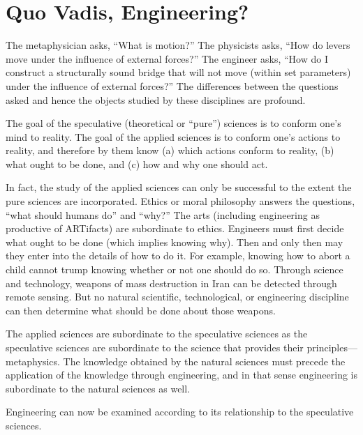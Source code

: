 \section{Quo Vadis, Engineering?}

The metaphysician asks, ``What is motion?'' The physicists asks, ``How do levers move under the influence of external forces?'' The engineer asks, ``How do I construct a structurally sound bridge that will not move (within set parameters) under the influence of external forces?'' The differences between the questions asked and hence the objects studied by these disciplines are profound.

The goal of the speculative (theoretical or ``pure'') sciences is to conform one's mind to reality. The goal of the applied sciences is to conform one's actions to reality, and therefore by them know (a) which actions conform to reality, (b) what ought to be done, and (c) how and why one should act.

In fact, the study of the applied sciences can only be successful to the extent the pure sciences are incorporated. Ethics or moral philosophy answers the questions, ``what should humans do'' and ``why?'' The arts (including engineering as productive of ARTifacts) are subordinate to ethics. Engineers must first decide what ought to be done (which implies knowing why). Then and only then may they enter into the details of how to do it. For example, knowing how to abort a child cannot trump knowing whether or not one should do so. Through science and technology, weapons of mass destruction in Iran can be detected through remote sensing. But no natural scientific, technological, or engineering discipline can then determine what should be done about those weapons.

The applied sciences are subordinate to the speculative sciences as the speculative sciences are subordinate to the science that provides their principles---metaphysics. The knowledge obtained by the natural sciences must precede the application of the knowledge through engineering, and in that sense engineering is subordinate to the natural sciences as well.

Engineering can now be examined according to its relationship to the speculative sciences.

